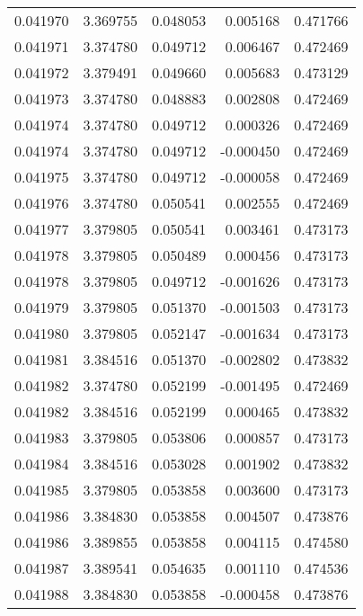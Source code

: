 \begin{tabular}{lrrrr}
0.041970    &  3.369755 &  0.048053 &  0.005168 &             0.471766 \\
0.041971    &  3.374780 &  0.049712 &  0.006467 &             0.472469 \\
0.041972    &  3.379491 &  0.049660 &  0.005683 &             0.473129 \\
0.041973    &  3.374780 &  0.048883 &  0.002808 &             0.472469 \\
0.041974    &  3.374780 &  0.049712 &  0.000326 &             0.472469 \\
0.041974    &  3.374780 &  0.049712 & -0.000450 &             0.472469 \\
0.041975    &  3.374780 &  0.049712 & -0.000058 &             0.472469 \\
0.041976    &  3.374780 &  0.050541 &  0.002555 &             0.472469 \\
0.041977    &  3.379805 &  0.050541 &  0.003461 &             0.473173 \\
0.041978    &  3.379805 &  0.050489 &  0.000456 &             0.473173 \\
0.041978    &  3.379805 &  0.049712 & -0.001626 &             0.473173 \\
0.041979    &  3.379805 &  0.051370 & -0.001503 &             0.473173 \\
0.041980    &  3.379805 &  0.052147 & -0.001634 &             0.473173 \\
0.041981    &  3.384516 &  0.051370 & -0.002802 &             0.473832 \\
0.041982    &  3.374780 &  0.052199 & -0.001495 &             0.472469 \\
0.041982    &  3.384516 &  0.052199 &  0.000465 &             0.473832 \\
0.041983    &  3.379805 &  0.053806 &  0.000857 &             0.473173 \\
0.041984    &  3.384516 &  0.053028 &  0.001902 &             0.473832 \\
0.041985    &  3.379805 &  0.053858 &  0.003600 &             0.473173 \\
0.041986    &  3.384830 &  0.053858 &  0.004507 &             0.473876 \\
0.041986    &  3.389855 &  0.053858 &  0.004115 &             0.474580 \\
0.041987    &  3.389541 &  0.054635 &  0.001110 &             0.474536 \\
0.041988    &  3.384830 &  0.053858 & -0.000458 &             0.473876 \\

\end{tabular}
